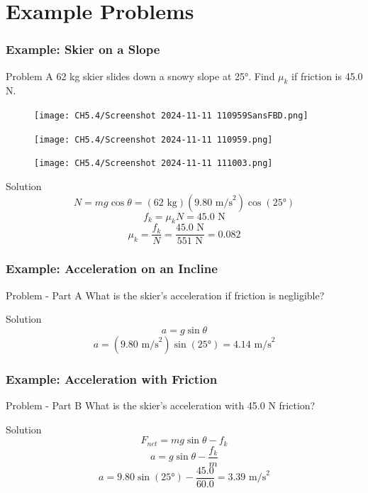 \documentclass{beamer}
\begin{document}
\section{Example Problems}

\begin{frame}
\frametitle{Example: Skier on a Slope}
\begin{block}{Problem}
A 62 kg skier slides down a snowy slope at 25°. Find $\mu_k$ if friction is 45.0 N.
\end{block}
\begin{figure}[H]
    \centering
    \texttt{[image: CH5.4/Screenshot 2024-11-11 110959SansFBD.png]}
\end{figure}
\end{frame}

\begin{frame}
\begin{figure}[H]
    \centering
    \texttt{[image: CH5.4/Screenshot 2024-11-11 110959.png]}
\end{figure}

\end{frame}

\begin{frame}
\begin{figure}[H]
    \centering
    \texttt{[image: CH5.4/Screenshot 2024-11-11 111003.png]}
\end{figure}

\begin{block}{Solution}
\[ N = mg\cos\theta = (62\text{ kg})(9.80\text{ m/s}^2)\cos(25°) \]
\[ f_k = \mu_k N = 45.0\text{ N} \]
\[ \mu_k = \frac{f_k}{N} = \frac{45.0\text{ N}}{551\text{ N}} = 0.082 \]
\end{block}
\end{frame}

\begin{frame}
\frametitle{Example: Acceleration on an Incline}
\begin{block}{Problem - Part A}
What is the skier's acceleration if friction is negligible?
\end{block}
\begin{block}{Solution}
\[ a = g\sin\theta \]
\[ a = (9.80\text{ m/s}^2)\sin(25°) = 4.14\text{ m/s}^2 \]
\end{block}
\end{frame}

\begin{frame}
\frametitle{Example: Acceleration with Friction}
\begin{block}{Problem - Part B}
What is the skier's acceleration with 45.0 N friction?
\end{block}
\begin{block}{Solution}
\[ F_{net} = mg\sin\theta - f_k \]
\[ a = g\sin\theta - \frac{f_k}{m} \]
\[ a = 9.80\sin(25°) - \frac{45.0}{60.0} = 3.39\text{ m/s}^2 \]
\end{block}
\end{frame}
\end{document}
